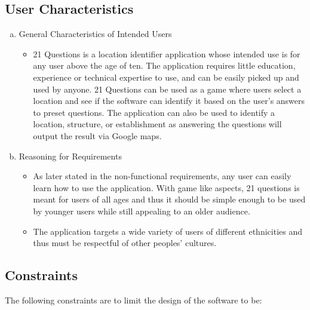 \documentclass[titlepage]{article}
\begin{document}
		\subsection{User Characteristics}
		\label{sub:user_characteristics}
		\begin{enumerate}[a)]
			\item General Characteristics of Intended Users 
			\begin{itemize}
				\item 21 Questions is a location identifier application whose intended use is for any user above the age of ten. The application requires little education, experience or technical expertise to use, and can be easily picked up and used by anyone. 21 Questions can be used as a game where users select a location and see if the software can identify it based on the user's answers to preset questions. The application can also be used to identify a location, structure, or establishment as answering the questions will output the result via Google maps.
			\end{itemize}
			\item Reasoning for Requirements
			\begin{itemize}
				\item As later stated in the non-functional requirements, any user can easily learn how to use the application. With game like aspects, 21 questions is meant for users of all ages and thus it should be simple enough to be used by younger users while still appealing to an older audience. 
				\item The application targets a wide variety of users of different ethnicities and thus must be respectful of other peoples' cultures.
			\end{itemize}
		\end{enumerate}
		
		
		\subsection{Constraints}
		\label{sub:constraints}
		The following constraints are to limit the design of the software to be:
		
\end{document}
